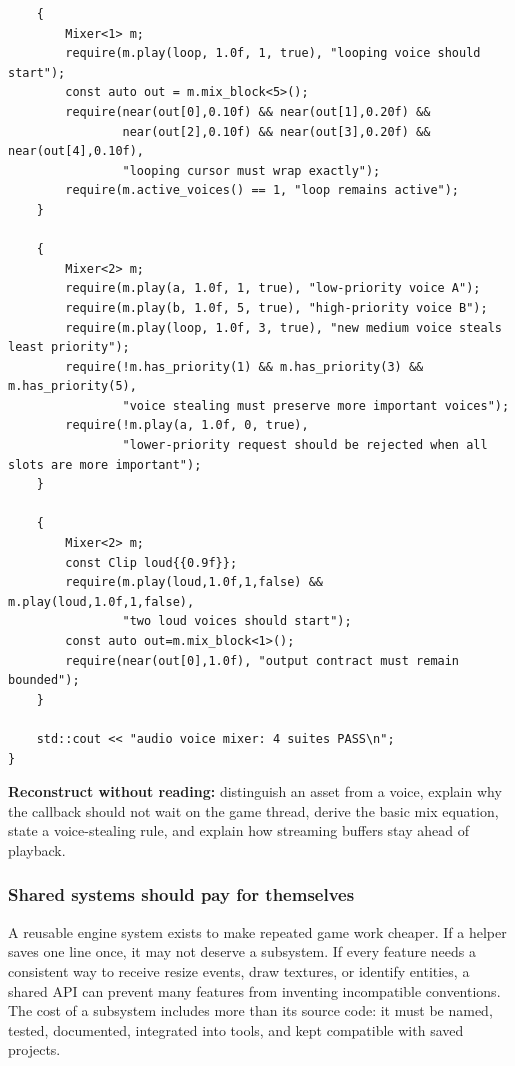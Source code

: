 \begin{verbatim}
    {
        Mixer<1> m;
        require(m.play(loop, 1.0f, 1, true), "looping voice should start");
        const auto out = m.mix_block<5>();
        require(near(out[0],0.10f) && near(out[1],0.20f) &&
                near(out[2],0.10f) && near(out[3],0.20f) && near(out[4],0.10f),
                "looping cursor must wrap exactly");
        require(m.active_voices() == 1, "loop remains active");
    }

    {
        Mixer<2> m;
        require(m.play(a, 1.0f, 1, true), "low-priority voice A");
        require(m.play(b, 1.0f, 5, true), "high-priority voice B");
        require(m.play(loop, 1.0f, 3, true), "new medium voice steals least priority");
        require(!m.has_priority(1) && m.has_priority(3) && m.has_priority(5),
                "voice stealing must preserve more important voices");
        require(!m.play(a, 1.0f, 0, true),
                "lower-priority request should be rejected when all slots are more important");
    }

    {
        Mixer<2> m;
        const Clip loud{{0.9f}};
        require(m.play(loud,1.0f,1,false) && m.play(loud,1.0f,1,false),
                "two loud voices should start");
        const auto out=m.mix_block<1>();
        require(near(out[0],1.0f), "output contract must remain bounded");
    }

    std::cout << "audio voice mixer: 4 suites PASS\n";
}
\end{verbatim}

\textbf{Reconstruct without reading:} distinguish an asset from a voice, explain why the callback should not wait on the game thread, derive the basic mix equation, state a voice-stealing rule, and explain how streaming buffers stay ahead of playback.

\subsubsection{Shared systems should pay for themselves}\label{05-engine-i-ch009-shared-systems-should-pay-for-themselves}

A reusable engine system exists to make repeated game work cheaper. If a helper saves one line once, it may not deserve a subsystem. If every feature needs a consistent way to receive resize events, draw textures, or identify entities, a shared API can prevent many features from inventing incompatible conventions. The cost of a subsystem includes more than its source code: it must be named, tested, documented, integrated into tools, and kept compatible with saved projects.


